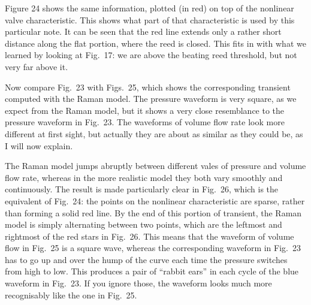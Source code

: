 
  Figure 24 shows the same information, plotted (in red) on top of the 
  nonlinear valve characteristic. This shows what part of that characteristic 
  is used by this particular note. It can be seen that the red line extends 
  only a rather short distance along the flat portion, where the reed is 
  closed. This fits in with what we learned by looking at Fig.\ 17: we are 
  above the beating reed threshold, but not very far above it. 


  Now compare Fig.\ 23 with Figs.\ 25, which shows the corresponding transient 
  computed with the Raman model. The pressure waveform is very square, as we 
  expect from the Raman model, but it shows a very close resemblance to the 
  pressure waveform in Fig.\ 23. The waveforms of volume flow rate look more 
  different at first sight, but actually they are about as similar as they 
  could be, as I will now explain. 


  The Raman model jumps abruptly between different vales of pressure and volume 
  flow rate, whereas in the more realistic model they both vary smoothly and 
  continuously. The result is made particularly clear in Fig.\ 26, which is the 
  equivalent of Fig.\ 24: the points on the nonlinear characteristic are 
  sparse, rather than forming a solid red line. By the end of this portion of 
  transient, the Raman model is simply alternating between two points, which 
  are the leftmost and rightmost of the red stars in Fig.\ 26. This means that 
  the waveform of volume flow in Fig.\ 25 is a square wave, whereas the 
  corresponding waveform in Fig.\ 23 has to go up and over the hump of the 
  curve each time the pressure switches from high to low. This produces a pair 
  of “rabbit ears” in each cycle of the blue waveform in Fig.\ 23. If you 
  ignore those, the waveform looks much more recognisably like the one in Fig.\ 
  25. 

